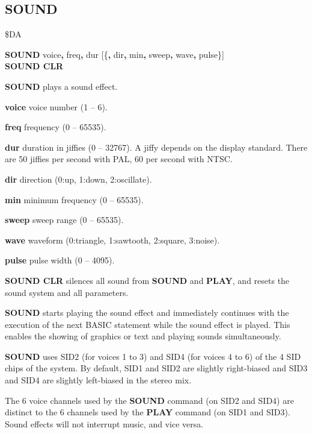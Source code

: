 \subsection{SOUND}
\begin{description}[leftmargin=2cm,style=nextline]
\item [Token:]    \$DA

\item [Format:]   {\bf SOUND} voice{\bf,} freq{\bf,} dur [\{{\bf,} dir{\bf,} min{\bf,} sweep{\bf,} wave{\bf,} pulse\}] \\
                  {\bf SOUND CLR}

\item [Usage:]    {\bf SOUND} plays a sound effect.

                  {\bf voice} voice number (1 -- 6).

                  {\bf freq} frequency (0 -- 65535).

                  {\bf dur} duration in jiffies (0 -- 32767). A jiffy depends on the display standard. There are 50 jiffies per second with PAL, 60 per second with NTSC.

                  {\bf dir} direction (0:up, 1:down, 2:oscillate).

                  {\bf min} minimum frequency (0 -- 65535).

                  {\bf sweep} sweep range (0 -- 65535).

                  {\bf wave} waveform (0:triangle, 1:sawtooth, 2:square, 3:noise).

                  {\bf pulse} pulse width (0 -- 4095).

                  {\bf SOUND CLR} silences all sound from {\bf SOUND} and {\bf PLAY}, and resets the sound system and all parameters.

\item [Remarks:]  {\bf SOUND} starts playing the sound effect and immediately continues with the execution of the next BASIC statement while the sound effect is played. This enables the showing of graphics or text and playing sounds simultaneously.

                  {\bf SOUND} uses SID2 (for voices 1 to 3) and SID4 (for voices 4 to 6) of the 4 SID chips of the system. By default, SID1 and SID2 are slightly right-biased and SID3 and SID4 are slightly left-biased in the stereo mix.

                  The 6 voice channels used by the {\bf SOUND} command (on SID2 and SID4) are distinct to the 6 channels used by the {\bf PLAY} command (on SID1 and SID3). Sound effects will not interrupt music, and vice versa.


\end{description}
